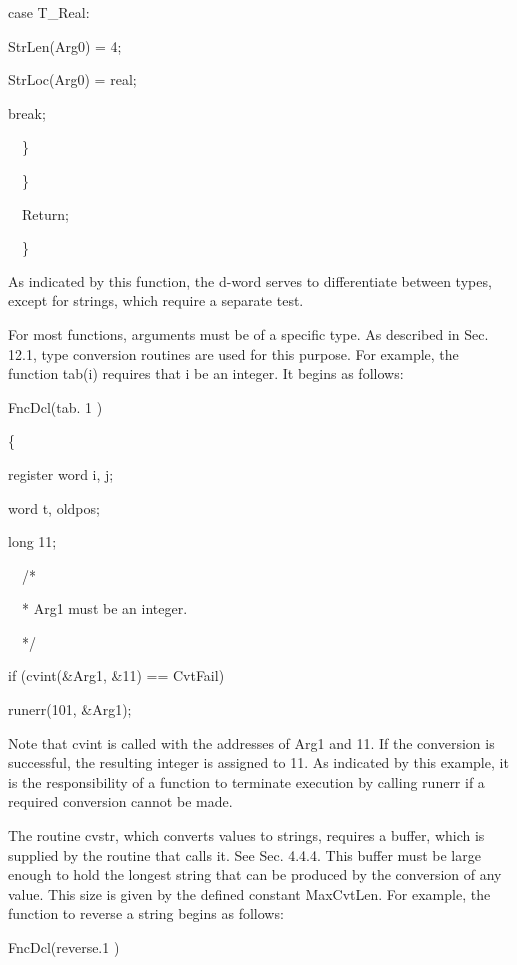 {\ttfamily\mdseries
case T\_Real:}

{\ttfamily\mdseries
StrLen(Arg0) = 4;}

{\ttfamily\mdseries
StrLoc(Arg0) = {\textquotedbl}real{\textquotedbl};}

{\ttfamily\mdseries
break;}

{\ttfamily\mdseries
\ \ \}}

{\ttfamily\mdseries
\ \ \}}

{\ttfamily\mdseries
\ \ Return;}

{\ttfamily\mdseries
\ \ \}}


As indicated by this function, the d-word serves to differentiate
between types, except for strings, which require a separate test.


For most functions, arguments must be of a specific type. As described
in Sec. 12.1, type conversion routines are used for this purpose. For
example, the function tab(i) requires that i be an integer. It begins
as follows:

{\ttfamily\mdseries
FncDcl(tab. 1 )}

{\ttfamily\mdseries
\{}

{\ttfamily\mdseries
register word i, j;}

{\ttfamily\mdseries
word t, oldpos;}

{\ttfamily\mdseries
long 11;}

{\ttfamily\mdseries
\ \ /*}

{\ttfamily\mdseries
\ \ * Arg1 must be an integer.}

{\ttfamily\mdseries
\ \ */}

{\ttfamily\mdseries
if (cvint(\&Arg1, \&11) == CvtFail)}

{\ttfamily\mdseries
runerr(101, \&Arg1);}


Note that cvint is called with the addresses of Arg1 and 11. If the
conversion is successful, the resulting integer is assigned to 11. As
indicated by this example, it is the responsibility of a function to
terminate execution by calling runerr if a required conversion cannot
be made.

The routine cvstr, which converts values to strings, requires a
buffer, which is supplied by the routine that calls it.  See
Sec. 4.4.4. This buffer must be large enough to hold the longest
string that can be produced by the conversion of any value. This size
is given by the defined constant MaxCvtLen. For example, the function
to reverse a string begins as follows:

{\ttfamily\mdseries
FncDcl(reverse.1 )}

